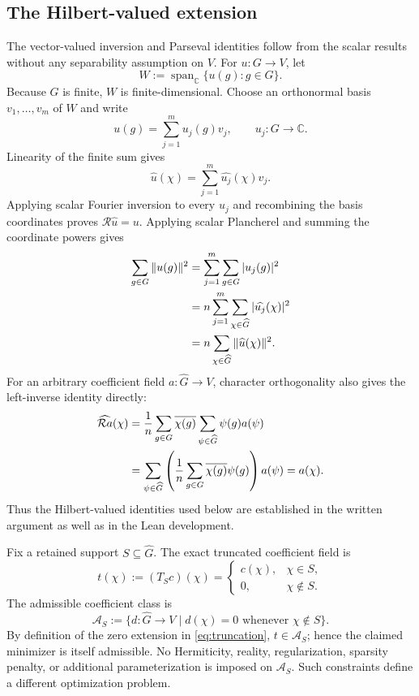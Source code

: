 \documentclass[11pt]{article}
\begin{document}
\subsection{The Hilbert-valued extension}
The vector-valued inversion and Parseval identities follow from the scalar results without any
separability assumption on $V$.  For $u:G\to V$, let
\[
  W:=\operatorname{span}_{\mathbb C}\{u(g):g\in G\}.
\]
Because $G$ is finite, $W$ is finite-dimensional.  Choose an orthonormal basis
$v_1,\ldots,v_m$ of $W$ and write
\[
  u(g)=\sum_{j=1}^{m}u_j(g)v_j,
  \qquad u_j:G\to\mathbb C.
\]
Linearity of the finite sum gives
\begin{equation}
  \widehat u(\chi)=\sum_{j=1}^{m}\widehat{u_j}(\chi)v_j.
  \label{eq:coordinate-transform}
\end{equation}
Applying scalar Fourier inversion to every $u_j$ and recombining the basis coordinates proves
$\mathcal R\widehat u=u$.  Applying scalar Plancherel and summing the coordinate powers gives
\begin{align}
  \sum_{g\in G}\|u(g)\|^2
  &=\sum_{j=1}^{m}\sum_{g\in G}|u_j(g)|^2 \notag\\
  &=n\sum_{j=1}^{m}\sum_{\chi\in\widehat G}|\widehat{u_j}(\chi)|^2 \notag\\
  &=n\sum_{\chi\in\widehat G}\|\widehat u(\chi)\|^2.
  \label{eq:vector-parseval}
\end{align}
For an arbitrary coefficient field $a:\widehat G\to V$, character orthogonality also gives the
left-inverse identity directly:
\begin{align}
  \widehat{\mathcal R a}(\chi)
  &=\frac1n\sum_{g\in G}\overline{\chi(g)}
      \sum_{\psi\in\widehat G}\psi(g)a(\psi) \notag\\
  &=\sum_{\psi\in\widehat G}
      \left(\frac1n\sum_{g\in G}\overline{\chi(g)}\psi(g)\right)a(\psi)
    =a(\chi).
  \label{eq:reconstruction-left-inverse}
\end{align}
Thus the Hilbert-valued identities used below are established in the written argument as well as
in the Lean development.

Fix a retained support $S\subseteq\widehat G$.  The exact truncated coefficient field is
\begin{equation}
  t(\chi):=(T_Sc)(\chi)=
  \begin{cases}
    c(\chi),&\chi\in S,\\
    0,&\chi\notin S.
  \end{cases}
  \label{eq:truncation}
\end{equation}
The admissible coefficient class is
\begin{equation}
  \mathcal A_S
  :=\{d:\widehat G\to V\mid d(\chi)=0\text{ whenever }\chi\notin S\}.
  \label{eq:admissible}
\end{equation}
By definition of the zero extension in \eqref{eq:truncation}, $t\in\mathcal A_S$; hence the claimed
minimizer is itself admissible.  No Hermiticity, reality, regularization, sparsity penalty, or
additional parameterization is
imposed on $\mathcal A_S$.  Such constraints define a different optimization problem.
\end{document}
